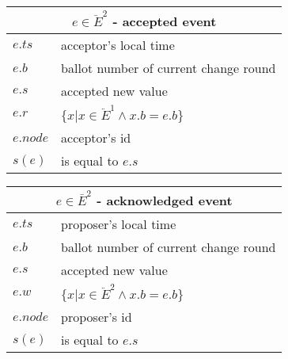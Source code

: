 \documentclass[a4paper,USenglish]{lipics-v2018}
\theoremstyle{definition}
\begin{document}
\begin{appendices}
\begin{figure}[!h]
            \vspace*{1cm}
        
            \begin{minipage}{0.47\textwidth}
                \centering
                \begin{tabular}{|p{1cm}|p{4cm}|}
                    \hline
                    \multicolumn{2}{|c|}{$e \in \ddot{E}^2$ - accepted event}\\
                    \hline
                    $e.ts$ & acceptor's local time\\
                    \hline
                    $e.b$ & ballot number of current change round\\
                    \hline
                    $e.s$ & accepted new value\\
                    \hline
                    $e.r$ & $\{ x | x \in \ddot{E}^1 \land x.b = e.b \}$\\
                    \hline
                    $e.node$ & acceptor's id\\
                    \hline
                    \hline
                    $s(e)$ & is equal to $e.s$\\
                    \hline
                \end{tabular}
            \end{minipage}
            \hspace{\fill} %
            \begin{minipage}{0.47\textwidth}
                \centering
                \begin{tabular}{|p{1cm}|p{4cm}|}
                    \hline
                    \multicolumn{2}{|c|}{$e \in \bar{E}^2$ - acknowledged event}\\
                    \hline
                    $e.ts$ & proposer's local time\\
                    \hline
                    $e.b$ & ballot number of current change round\\
                    \hline
                    $e.s$ & accepted new value\\
                    \hline
                    $e.w$ & $\{ x | x \in \ddot{E}^2 \land x.b = e.b \}$\\
                    \hline
                    $e.node$ & proposer's id\\
                    \hline
                    \hline
                    $s(e)$ & is equal to $e.s$\\
                    \hline
                \end{tabular}
            \end{minipage}
        

\end{figure}
\end{appendices}
\end{document}
